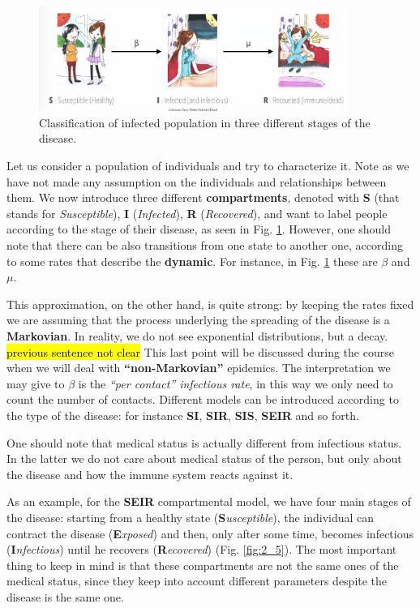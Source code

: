\documentclass[../main/main.tex]{subfiles}
\begin{document}
\begin{figure}[!b]
\centering
\includegraphics[width=0.9\textwidth]{../lessons/image/02/1_classification.png}
\caption{\label{fig:1_classification} Classification of infected population in three different stages of the disease.}
\end{figure}

Let us consider a population of individuals and try to characterize it. Note as we have not made any assumption on the individuals and relationships between them. We now introduce three different \textbf{compartments}, denoted with \textbf{S} (that stands for \textit{Susceptible}), \textbf{I} (\textit{Infected}), \textbf{R} (\textit{Recovered}), and want to label people according to the stage of their disease, as seen in Fig. \ref{fig:1_classification}. However, one should note that there can be also transitions from one state to another one, according to some rates that describe the \textbf{dynamic}. For instance, in Fig. \ref{fig:1_classification} these are $\beta$ and $\mu$.

This approximation, on the other hand, is quite strong: by keeping the rates fixed we are assuming that the process underlying the spreading of the disease is a \textbf{Markovian}. In reality, we do not see exponential distributions, but a decay. \hl{previous sentence not clear} This last point will be discussed during the course when we will deal with \textbf{“non-Markovian”} epidemics. The interpretation we may give to $\beta$ is the \textit{“per contact” infectious rate}, in this way we only need to count the number of contacts.
Different models can be introduced according to the type of the disease: for instance \textbf{SI}, \textbf{SIR}, \textbf{SIS}, \textbf{SEIR} and so forth.


One should note that medical status is actually different from infectious status. In the latter we do not care about medical status of the person, but only about the disease and how the immune system reacts against it.

As an example, for the \textbf{SEIR} compartmental model, we have four main stages of the disease: starting from a healthy state (\textbf{S}\textit{usceptible}), the individual can contract the disease (\textbf{E}\textit{xposed}) and then, only after some time, becomes infectious (\textbf{I}\textit{nfectious}) until he recovers (\textbf{R}\textit{ecovered}) (Fig. \ref{fig:2_5}). The most important thing to keep in mind is that these compartments are not the same ones of the medical status, since they keep into account different parameters despite the disease is the same one.
\end{document}

